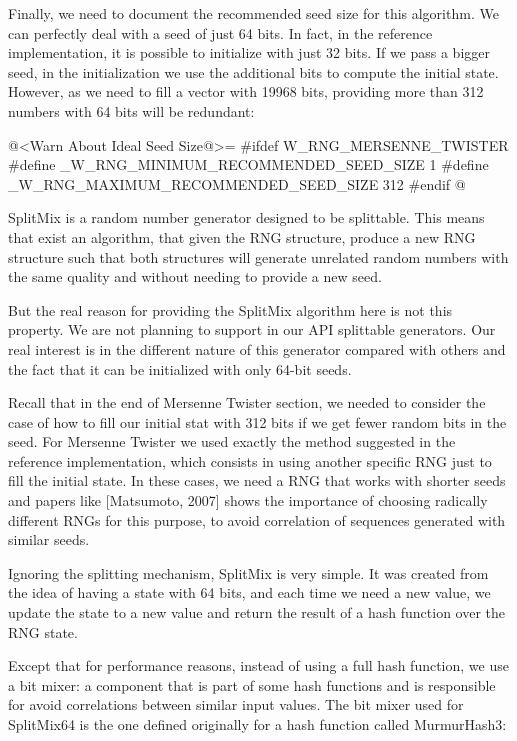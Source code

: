 Finally, we need to document the recommended seed size for this
algorithm. We can perfectly deal with a seed of just 64 bits. In fact,
in the reference implementation, it is possible to initialize with
just 32 bits. If we pass a bigger seed, in the initialization we use
the additional bits to compute the initial state. However, as we need
to fill a vector with 19968 bits, providing more than 312 numbers with
64 bits will be redundant:

\iniciocodigo
@<Warn About Ideal Seed Size@>=
#ifdef W_RNG_MERSENNE_TWISTER
#define _W_RNG_MINIMUM_RECOMMENDED_SEED_SIZE  1
#define _W_RNG_MAXIMUM_RECOMMENDED_SEED_SIZE  312
#endif
@
\fimcodigo


SplitMix is a random number generator designed to be splittable. This
means that exist an algorithm, that given the RNG structure, produce a
new RNG structure such that both structures will generate unrelated
random numbers with the same quality and without needing to provide a
new seed.

But the real reason for providing the SplitMix algorithm here is not
this property. We are not planning to support in our API splittable
generators. Our real interest is in the different nature of this
generator compared with others and the fact that it can be initialized
with only 64-bit seeds.

Recall that in the end of Mersenne Twister section, we needed to
consider the case of how to fill our initial stat with 312 bits if we
get fewer random bits in the seed. For Mersenne Twister we used
exactly the method suggested in the reference implementation, which
consists in using another specific RNG just to fill the initial
state. In these cases, we need a RNG that works with shorter seeds and
papers like [Matsumoto, 2007] shows the importance of choosing
radically different RNGs for this purpose, to avoid correlation of
sequences generated with similar seeds.

Ignoring the splitting mechanism, SplitMix is very simple. It was
created from the idea of having a state with 64 bits, and each time we
need a new value, we update the state to a new value and return the
result of a hash function over the RNG state.

Except that for performance reasons, instead of using a full hash
function, we use a bit mixer: a component that is part of some hash
functions and is responsible for avoid correlations between similar
input values. The bit mixer used for SplitMix64 is the one defined
originally for a hash function called MurmurHash3:

